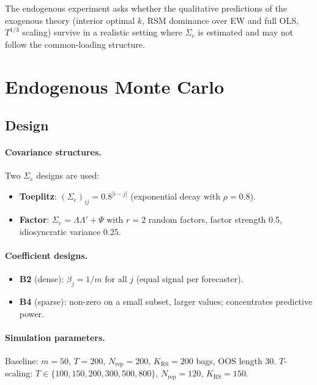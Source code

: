 \documentclass[12pt,a4paper]{article}
\theoremstyle{definition}
\begin{document}
The endogenous experiment asks whether the qualitative predictions of the
exogenous theory (interior optimal $k$, RSM dominance over EW and full OLS,
$T^{1/3}$ scaling) survive in a realistic setting where $\Sigma_e$ is
estimated and may not follow the common-loading structure.

\section{Endogenous Monte Carlo}
\label{sec:endomc}

\subsection{Design}

\paragraph{Covariance structures.}
Two $\Sigma_e$ designs are used:
\begin{itemize}
\item \textbf{Toeplitz}: $(\Sigma_e)_{ij}=0.8^{|i-j|}$ (exponential decay
  with $\rho=0.8$).
\item \textbf{Factor}: $\Sigma_e=\Lambda\Lambda'+\Psi$ with $r=2$ random
  factors, factor strength 0.5, idiosyncratic variance 0.25.
\end{itemize}

\paragraph{Coefficient designs.}
\begin{itemize}
\item \textbf{B2} (dense): $\beta_j=1/m$ for all $j$ (equal signal per
  forecaster).
\item \textbf{B4} (sparse): non-zero on a small subset, larger values;
  concentrates predictive power.
\end{itemize}

\paragraph{Simulation parameters.}
Baseline: $m=50$, $T=200$, $N_{\mathrm{rep}}=200$, $K_{\mathrm{RS}}=200$
bags, OOS length 30. $T$-scaling: $T\in\{100,150,200,300,500,800\}$,
$N_{\mathrm{rep}}=120$, $K_{\mathrm{RS}}=150$.
\end{document}
